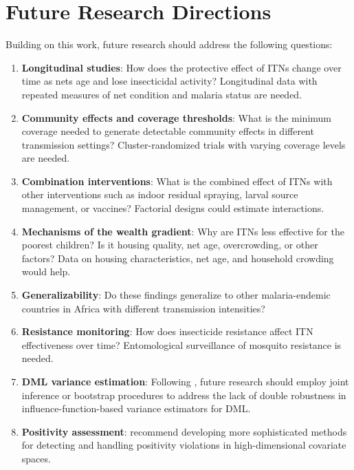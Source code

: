 \section{Future Research Directions}

Building on this work, future research should address the following questions:

\begin{enumerate}
	\item \textbf{Longitudinal studies}: How does the protective effect of ITNs change over time as nets age and lose insecticidal activity? Longitudinal data with repeated measures of net condition and malaria status are needed.
	
	\item \textbf{Community effects and coverage thresholds}: What is the minimum coverage needed to generate detectable community effects in different transmission settings? Cluster-randomized trials with varying coverage levels are needed.
	
	\item \textbf{Combination interventions}: What is the combined effect of ITNs with other interventions such as indoor residual spraying, larval source management, or vaccines? Factorial designs could estimate interactions.
	
	\item \textbf{Mechanisms of the wealth gradient}: Why are ITNs less effective for the poorest children? Is it housing quality, net age, overcrowding, or other factors? Data on housing characteristics, net age, and household crowding would help.
	
	\item \textbf{Generalizability}: Do these findings generalize to other malaria-endemic countries in Africa with different transmission intensities?
	
	\item \textbf{Resistance monitoring}: How does insecticide resistance affect ITN effectiveness over time? Entomological surveillance of mosquito resistance is needed.
	
	\item \textbf{DML variance estimation}: Following \citet{wu2025double}, future research should employ joint inference or bootstrap procedures to address the lack of double robustness in influence-function-based variance estimators for DML.
	
	\item \textbf{Positivity assessment}: \citet{westreich2010invited} recommend developing more sophisticated methods for detecting and handling positivity violations in high-dimensional covariate spaces.
\end{enumerate}


